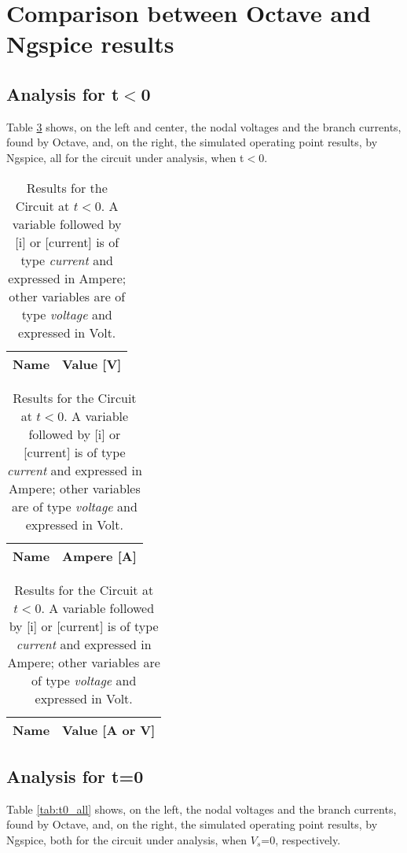 \section{Comparison between Octave and Ngspice results}
\label{sec:comparison}

\subsection{Analysis for t$<$0}

\par Table \ref{tab:tb0_all} shows, on the left and center, the nodal voltages and the
branch currents, found by Octave, and, on the right, the simulated operating point results,
by Ngspice, all for the circuit under analysis, when t$<$0.

\begin{table}[htb!]
  \centering
  \begin{tabular}{|l|r|}
      \hline    
      {\bf Name} & {\bf Value [V]} \\ \hline
      
  \end{tabular}
\quad
  \begin{tabular}{|l|r|}
    \hline    
    {\bf Name} & {\bf Ampere [A]} \\ \hline
    
  \end{tabular}
\quad
  \begin{tabular}{|l|r|}
    \hline    
    {\bf Name} & {\bf Value [A or V]} \\ \hline
    
  \end{tabular}
  \caption{Results for the Circuit at $t<0$. A variable followed by [i] or [current] is of type {\em current} and expressed in Ampere; other variables are of type {\it voltage} and expressed in Volt.}
  \label{tab:tb0_all}
\end{table}

\newpage
\subsection{Analysis for t=0}

\par Table \ref{tab:t0_all} shows, on the left, the nodal voltages and the branch
currents, found by Octave, and, on the right, the simulated operating point results,
by Ngspice, both for the circuit under analysis, when $V_s$=0, respectively.

